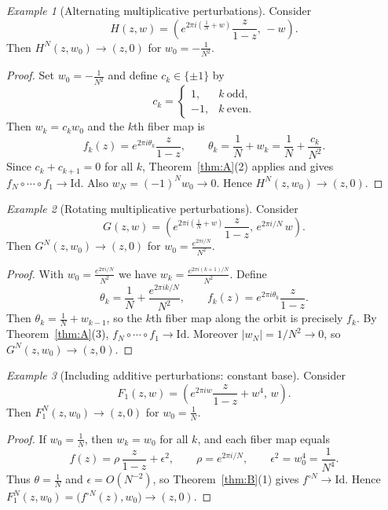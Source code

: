 \documentclass{amsart}
\theoremstyle{remark}
\newtheorem{exmp}{Example}
\theoremstyle{definition}
\begin{document}
\begin{exmp}[Alternating multiplicative perturbations]\label{exmp:skew-alternating}
Consider
\[
H(z,w)=\left(e^{2\pi i(\frac{1}{N}+w)}\frac{z}{1-z},\, -w\right).
\]
Then $H^{N}(z,w_0)\to (z,0)$ for $w_0=-\frac{1}{N^2}$.
\end{exmp}

\begin{proof}
Set $w_0=-\frac{1}{N^2}$ and define $c_k\in\{\pm1\}$ by
\[
c_k=\begin{cases}
1,& k\ \text{odd},\\
-1,& k\ \text{even}.
\end{cases}
\]
Then $w_k=c_k w_0$ and the $k$th fiber map is
\[
f_k(z)=e^{2\pi i\theta_k}\frac{z}{1-z},
\qquad \theta_k=\frac{1}{N}+w_k=\frac{1}{N}+\frac{c_k}{N^2}.
\]
Since $c_k+c_{k+1}=0$ for all $k$, Theorem~\ref{thm:A}(2) applies and gives
\(
f_N\circ\cdots\circ f_1\to \mathrm{Id}.
\)
Also $w_N=(-1)^N w_0\to 0$. Hence $H^N(z,w_0)\to (z,0)$.
\end{proof}

\begin{exmp}[Rotating multiplicative perturbations]
Consider
\[
G(z,w)=\left(e^{2\pi i(\frac{1}{N}+w)}\frac{z}{1-z},\, e^{2\pi i/N}\,w\right).
\]
Then $G^{N}(z,w_0)\to (z,0)$ for $w_0=\frac{e^{2\pi i/N}}{N^2}$.
\end{exmp}

\begin{proof}
With $w_0=\frac{e^{2\pi i/N}}{N^2}$ we have
\(
w_k=\frac{e^{2\pi i(k+1)/N}}{N^2}.
\)
Define
\[
\theta_k=\frac{1}{N}+\frac{e^{2\pi i k/N}}{N^2},
\qquad 
f_k(z)=e^{2\pi i\theta_k}\frac{z}{1-z}.
\]
Then $\theta_k=\frac{1}{N}+w_{k-1}$, so the $k$th fiber map along the orbit is precisely $f_k$. By Theorem~\ref{thm:A}(3),
\(
f_N\circ\cdots\circ f_1\to \mathrm{Id}.
\)
Moreover $|w_N|=1/N^2\to 0$, so $G^{N}(z,w_0)\to (z,0)$.
\end{proof}

\begin{exmp}[Including additive perturbations: constant base]
Consider
\[
F_1(z,w)=\left(e^{2\pi i w}\frac{z}{1-z}+w^4,\,w\right).
\]
Then $F_1^{N}(z,w_0)\to (z,0)$ for $w_0=\frac{1}{N}$.
\end{exmp}

\begin{proof}
If $w_0=\frac{1}{N}$, then $w_k=w_0$ for all $k$, and each fiber map equals
\[
f(z)=\rho\,\frac{z}{1-z}+\epsilon^2,
\qquad 
\rho=e^{2\pi i/N},
\qquad 
\epsilon^2=w_0^4=\frac{1}{N^4}.
\]
Thus $\theta=\frac{1}{N}$ and $\epsilon=O(N^{-2})$, so Theorem~\ref{thm:B}(1) gives
\(
f^{\circ N}\to \mathrm{Id}.
\)
Hence
\(
F_1^N(z,w_0)=\bigl(f^{\circ N}(z),w_0\bigr)\to (z,0).
\)
\end{proof}
\end{document}
